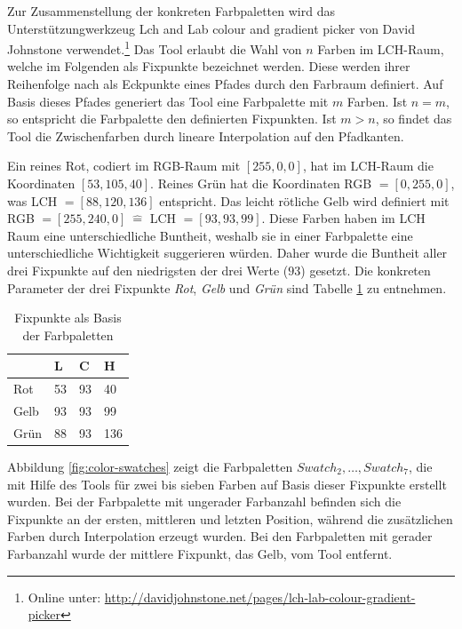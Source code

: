 Zur Zusammenstellung der konkreten Farbpaletten wird das Unterstützungwerkzeug \glqq Lch and Lab colour and gradient picker\grqq{} von David Johnstone verwendet.\footnote{Online unter: \url{http://davidjohnstone.net/pages/lch-lab-colour-gradient-picker}} Das Tool erlaubt die Wahl von $n$ Farben im LCH-Raum, welche im Folgenden als \glqq Fixpunkte\grqq{} bezeichnet werden. Diese werden ihrer Reihenfolge nach als Eckpunkte eines Pfades durch den Farbraum definiert. Auf Basis dieses Pfades generiert das Tool eine Farbpalette mit $m$ Farben. Ist $n = m$, so entspricht die Farbpalette den definierten Fixpunkten. Ist $m > n$, so findet das Tool die Zwischenfarben durch lineare Interpolation auf den Pfadkanten.\cite{johnstone}

Ein \glqq reines Rot\grqq, codiert im RGB-Raum mit $[255,0,0]$, hat im LCH-Raum die Koordinaten $[53,105,40]$. \glqq Reines Grün\grqq{} hat die Koordinaten RGB $=[0,255,0]$, was LCH $= [88,120,136]$ entspricht. Das \glqq leicht rötliche Gelb\grqq{} wird definiert mit RGB $=[255,240,0]\ \hat{=}$ LCH $= [93,93,99]$. Diese Farben haben im LCH Raum eine unterschiedliche Buntheit, weshalb sie in einer Farbpalette eine unterschiedliche Wichtigkeit suggerieren würden.\cite{bigman} Daher wurde die Buntheit aller drei Fixpunkte auf den niedrigsten der drei Werte ($93$) gesetzt. Die konkreten Parameter der drei Fixpunkte \emph{Rot}, \emph{Gelb} und \emph{Grün} sind Tabelle \ref{tab:fixpoints} zu entnehmen. 

\begin{table}[h]
\centering
\caption{Fixpunkte als Basis der Farbpaletten}
\label{tab:fixpoints}
\begin{tabular}{@{}llll@{}}
\toprule
                                     & L      & C     & H      \\ \midrule
Rot   & 53     & 93    & 40     \\
Gelb  & 93     & 93    & 99     \\
Grün  & 88     & 93    & 136    \\ \bottomrule
\end{tabular}
\end{table}

Abbildung \ref{fig:color-swatches} zeigt die Farbpaletten $Swatch_2, \ldots, Swatch_7$, die mit Hilfe des Tools für zwei bis sieben Farben auf Basis dieser Fixpunkte erstellt wurden. Bei der Farbpalette mit ungerader Farbanzahl befinden sich die Fixpunkte an der ersten, mittleren und letzten Position, während die zusätzlichen Farben durch Interpolation erzeugt wurden. Bei den Farbpaletten mit gerader Farbanzahl wurde der mittlere Fixpunkt, das Gelb, vom Tool entfernt.


